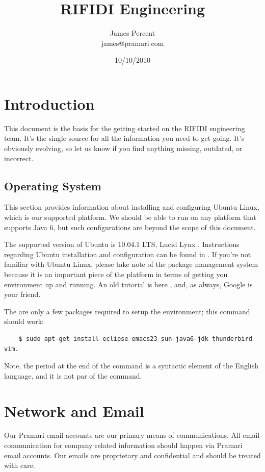 \documentclass[11pt]{article}
\title{RIFIDI Engineering}
\author{James Percent \\ james@pramari.com}
\date{10/10/2010}                                           %
\begin{document}
\maketitle

\section{Introduction}

This document is the basis for the getting started on the RIFIDI engineering team.  It's the single source for all the information you need to get going.  It's obviously evolving, so let us know if you find anything missing, outdated, or incorrect.

\subsection{Operating System}\label{os}

This section provides information about installing and configuring Ubuntu Linux, which is our supported platform.  We should be able to run on any platform that supports Java 6, but such configurations are beyond the scope of this document.

The supported version of Ubuntu is 10.04.1 LTS, Lucid Lynx \cite{ubuntu, lucid}.  Instructions regarding Ubuntu installation and configuration can be found in \cite{lucid-doc}.  If you're not familiar with Ubuntu Linux, please take note of the package management system because it is an important piece of the platform in terms of getting you environment up and running.  An old tutorial is here \cite{apt-get-tut}, and, as always, Google is your friend.

The are only a few packages required to setup the environment; this command should work:
\begin{verbatim}
	$ sudo apt-get install eclipse emacs23 sun-java6-jdk thunderbird vim.
\end{verbatim}

Note, the period at the end of the command is a syntactic element of the English language, and it is not par of the command.

\section{Network and Email}

Our Pramari email accounts are our primary means of communications.  All email communication for company related information should happen via Pramari email accounts.   Our emails are proprietary and confidential and should be treated with care.  
\end{document}
